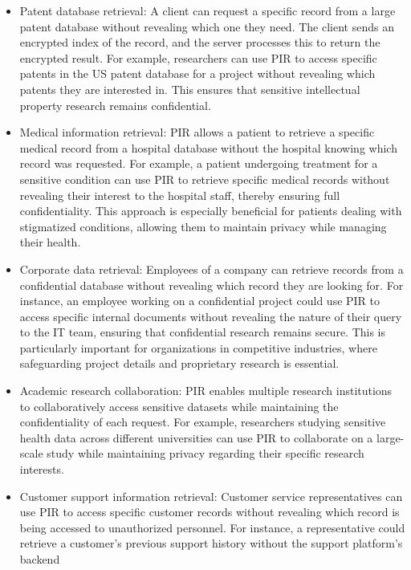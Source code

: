 \documentclass[
  letterpaper,
  DIV=11,
  numbers=noendperiod,
  oneside]{scrartcl}
\begin{document}
\begin{itemize}
\item
  Patent database retrieval: A client can request a specific record from
  a large patent database without revealing which one they need. The
  client sends an encrypted index of the record, and the server
  processes this to return the encrypted result. For example,
  researchers can use PIR to access specific patents in the US patent
  database for a project without revealing which patents they are
  interested in. This ensures that sensitive intellectual property
  research remains confidential.
\item
  Medical information retrieval: PIR allows a patient to retrieve a
  specific medical record from a hospital database without the hospital
  knowing which record was requested. For example, a patient undergoing
  treatment for a sensitive condition can use PIR to retrieve specific
  medical records without revealing their interest to the hospital
  staff, thereby ensuring full confidentiality. This approach is
  especially beneficial for patients dealing with stigmatized
  conditions, allowing them to maintain privacy while managing their
  health.
\item
  Corporate data retrieval: Employees of a company can retrieve records
  from a confidential database without revealing which record they are
  looking for. For instance, an employee working on a confidential
  project could use PIR to access specific internal documents without
  revealing the nature of their query to the IT team, ensuring that
  confidential research remains secure. This is particularly important
  for organizations in competitive industries, where safeguarding
  project details and proprietary research is essential.
\item
  Academic research collaboration: PIR enables multiple research
  institutions to collaboratively access sensitive datasets while
  maintaining the confidentiality of each request. For example,
  researchers studying sensitive health data across different
  universities can use PIR to collaborate on a large-scale study while
  maintaining privacy regarding their specific research interests.
\item
  Customer support information retrieval: Customer service
  representatives can use PIR to access specific customer records
  without revealing which record is being accessed to unauthorized
  personnel. For instance, a representative could retrieve a customer's
  previous support history without the support platform's backend

\end{itemize}
\end{document}
